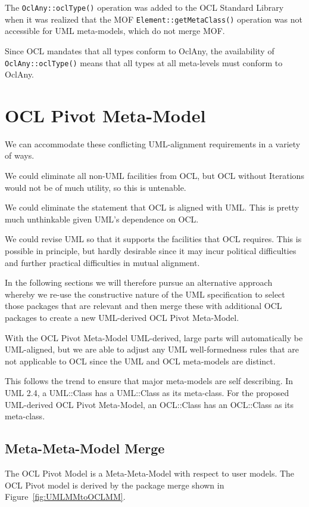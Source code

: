 \documentclass{eceasst}
\begin{document}
The \verb|OclAny::oclType()| operation was added to the OCL Standard Library when it was realized that the MOF \verb|Element::getMetaClass()| operation was not accessible for UML meta-models, which do not merge MOF.

Since OCL mandates that all types conform to OclAny, the availability of \verb|OclAny::oclType()| means that all types at all meta-levels must conform to OclAny.   


\section{OCL Pivot Meta-Model}

We can accommodate these conflicting UML-alignment requirements in a variety of ways.

We could eliminate all non-UML facilities from OCL, but OCL without Iterations would not be of much utility, so this is untenable.

We could eliminate the statement that OCL is aligned with UML. This is pretty much unthinkable given UML's dependence on OCL.

We could revise UML so that it supports the facilities that OCL requires. This is possible in principle, but hardly desirable since it may incur political difficulties and further practical difficulties in mutual alignment.

In the following sections we will therefore pursue an alternative approach whereby we re-use the constructive nature of the UML specification to select those packages that are relevant and then merge these with additional OCL packages to create a new UML-derived OCL Pivot Meta-Model.

With the OCL Pivot Meta-Model UML-derived, large parts will automatically be UML-aligned, but we are able to adjust any UML well-formedness rules that are not applicable to OCL since the UML and OCL meta-models are distinct.

This follows the trend to ensure that major meta-models are self describing. In UML 2.4, a UML::Class has a UML::Class as its meta-class. For the proposed UML-derived OCL Pivot Meta-Model, an OCL::Class has an OCL::Class as its meta-class.  


\subsection{Meta-Meta-Model Merge}

The OCL Pivot Model is a Meta-Meta-Model with respect to user models. The OCL Pivot model is derived by the package merge  shown in Figure~\ref{fig:UMLMMtoOCLMM}.
\end{document}
